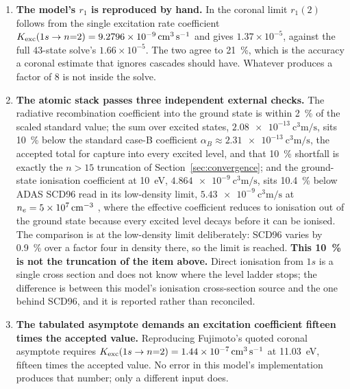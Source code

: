 \begin{enumerate}
\item \textbf{The model's $r_1$ is reproduced by hand.} In the coronal limit
$r_1(2)$ follows from the single excitation rate coefficient
$K_{\rm exc}(1s\to n{=}2) = \SI{9.2796e-9}{\cubic\centi\metre\per\second}$ and
gives $1.37\times10^{-5}$, against the full $43$-state solve's
$1.66\times10^{-5}$. The two agree to \SI{21}{\percent}, which is the accuracy a
coronal estimate that ignores cascades should have. Whatever produces a factor
of $8$ is not inside the solve.

\item \textbf{The atomic stack passes three independent external checks.} The
radiative recombination coefficient into the ground state is within
\SI{2}{\percent} of the scaled standard value; the sum over excited states,
$\SI{2.08e-13}{\cubic\centi\metre\per\second}$, sits \SI{10}{\percent} below the
standard case-B coefficient $\alpha_B \approx
\SI{2.31e-13}{\cubic\centi\metre\per\second}$, the accepted total for capture
into every excited level, and that \SI{10}{\percent} shortfall is exactly the
$n>15$ truncation of Section~\ref{sec:convergence}; and the ground-state ionisation
coefficient at \SI{10}{\electronvolt}, $\SI{4.864e-9}{\cubic\centi\metre\per\second}$,
sits \SI{10.4}{\percent} below ADAS SCD96 read in its low-density limit,
$\SI{5.43e-9}{\cubic\centi\metre\per\second}$ at
$n_e = \SI{5e7}{\per\cubic\centi\metre}$ \cite{Summers2006, ADAS}, where the
effective coefficient reduces to ionisation out of the ground state because
every excited level decays before it can be ionised. The comparison is at the
low-density limit deliberately: SCD96 varies by \SI{0.9}{\percent} over a
factor four in density there, so the limit is reached. \textbf{This
\SI{10}{\percent} is not the truncation of the item above.} Direct ionisation
from $1s$ is a single cross section and does not know where the level ladder
stops; the difference is between this model's ionisation cross-section source
and the one behind SCD96, and it is reported rather than reconciled.

\item \textbf{The tabulated asymptote demands an excitation coefficient fifteen
times the accepted value.}
Reproducing Fujimoto's quoted coronal asymptote requires
$K_{\rm exc}(1s\to n{=}2) = \SI{1.44e-7}{\cubic\centi\metre\per\second}$ at
\SI{11.03}{\electronvolt}, fifteen times the accepted value. No error in this
model's implementation produces that number; only a different input does.


\end{enumerate}
